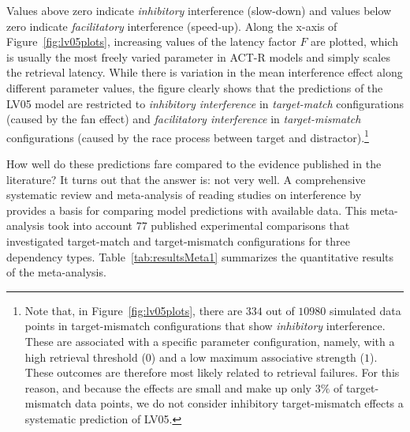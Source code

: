 \documentclass{cambridge7A}\usepackage[]{graphicx}\usepackage[]{color}
\begin{document}
Values above zero indicate  \emph{inhibitory} interference (slow-down) and values below zero indicate  \emph{facilitatory} interference (speed-up). 
Along the x-axis of Figure~\ref{fig:lv05plots}, increasing values of the latency factor $F$ are plotted, which is usually the most freely varied parameter in ACT-R models and simply scales the retrieval latency. 
While there is variation in the mean interference effect along different parameter values, the figure clearly shows that the predictions of the LV05 model are restricted to \emph{inhibitory interference} in \emph{target-match} configurations (caused by the fan effect) and \emph{facilitatory interference} in \emph{target-mismatch} configurations (caused by the race process between target and distractor).\footnote{Note that, in Figure~\ref{fig:lv05plots}, there are $334$ out of $10980$ simulated data points in target-mismatch configurations that show \textit{inhibitory} interference. These are associated with a specific parameter configuration, namely, with a high retrieval threshold ($0$) and a low maximum associative strength ($1$). These outcomes are therefore most likely related to retrieval failures. For this reason, and because the effects are small and make up only $3\%$ of target-mismatch data points, we do not consider inhibitory target-mismatch effects a systematic prediction of LV05.}

How well do these predictions fare compared to the evidence published in the literature? It turns out that the answer is: not very well. 
A comprehensive systematic review and  meta-analysis of reading studies on interference by \cite{JaegerEngelmannVasishth2017} provides a basis for comparing model predictions with available data. This meta-analysis took into account $77$ published experimental comparisons that investigated target-match and target-mismatch configurations for three dependency types.
Table~\ref{tab:resultsMeta1} summarizes the quantitative results of the meta-analysis.
\end{document}

